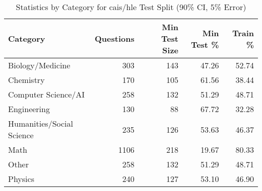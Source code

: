 \begin{table}[H]
\centering
\begin{tabular}{lrrrr}
\toprule
Category & Questions & Min Test Size & Min Test \% & Train \% \\
\midrule
Biology/Medicine & 303 & 143 & 47.26 & 52.74 \\
Chemistry & 170 & 105 & 61.56 & 38.44 \\
Computer Science/AI & 258 & 132 & 51.29 & 48.71 \\
Engineering & 130 & 88 & 67.72 & 32.28 \\
Humanities/Social Science & 235 & 126 & 53.63 & 46.37 \\
Math & 1106 & 218 & 19.67 & 80.33 \\
Other & 258 & 132 & 51.29 & 48.71 \\
Physics & 240 & 127 & 53.10 & 46.90 \\
\bottomrule
\end{tabular}
\vspace{0.2cm}
\caption{Statistics by Category for cais/hle Test Split (90\% CI, 5\% Error)}
\label{tab:split_analysis}
\end{table}

